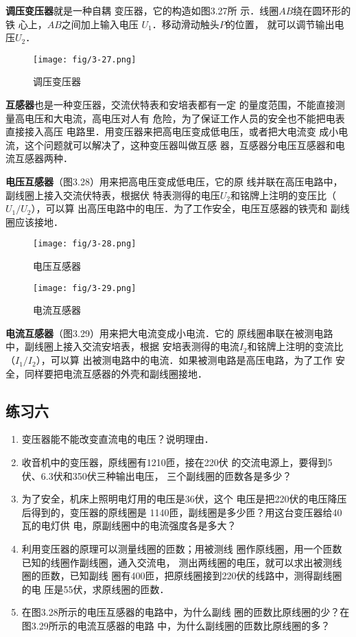 \textbf{调压变压器}就是一种自耦
变压器，它的构造如图3.27所
示．线圈$AB$绕在圆环形的铁
心上，$AB$之间加上输入电压
$U_1$．移动滑动触头$P$的位置，
就可以调节输出电压$U_2$．
\begin{figure}[htp]\centering
\texttt{[image: fig/3-27.png]}
\caption{调压变压器}
\end{figure}

\textbf{互感器}也是一种变压器，交流伏特表和安培表都有一定
的量度范围，不能直接测量高电压和大电流，高电压对人有
危险，为了保证工作人员的安全也不能把电表直接接入高压
电路里．用变压器来把高电压变成低电压，或者把大电流变
成小电流，这个问题就可以解决了，这种变压器叫做互感
器，互感器分电压互感器和电流互感器两种．

\textbf{电压互感器}（图3.28）用来把高电压变成低电压，它的原
线并联在高压电路中，副线圈上接入交流伏特表，根据伏
特表测得的电压$U_2$和铭牌上注明的变压比（$U_1/U_2$），可以算
出高压电路中的电压．为了工作安全，电压互感器的铁壳和
副线圈应该接地．


\begin{figure}[htp]\centering
	\begin{minipage}[t]{0.48\textwidth}
		\centering
\texttt{[image: fig/3-28.png]}
\caption{电压互感器}
	\end{minipage}
	\begin{minipage}[t]{0.48\textwidth}
		\centering
\texttt{[image: fig/3-29.png]}
\caption{电流互感器}
	\end{minipage}
\end{figure}

\textbf{电流互感器}（图3.29）用来把大电流变成小电流．它的
原线圈串联在被测电路中，副线圈上接入交流安培表，根据
安培表测得的电流$I_2$和铭牌上注明的变流比（$I_1/I_2$），可以算
出被测电路中的电流．如果被测电路是高压电路，为了工作
安全，同样要把电流互感器的外壳和副线圈接地．

\subsection*{练习六}
\begin{enumerate}
    \item 变压器能不能改变直流电的电压？说明理由．
    \item 收音机中的变压器，原线圈有1210匝，接在220伏
的交流电源上，要得到5伏、6.3伏和350伏三种输出电压，
三个副线圈的匝数各是多少？
\item 为了安全，机床上照明电灯用的电压是36伏，这个
电压是把220伏的电压降压后得到的，变压器的原线圈是
1140匝，副线圈是多少匝？用这台变压器给40瓦的电灯供
电，原副线圈中的电流强度各是多大？
\item 利用变压器的原理可以测量线圈的匝数；用被测线
圈作原线圈，用一个匝数已知的线圈作副线圈，通入交流电，
测出两线圈的电压，就可以求出被测线圈的匝数，已知副线
圈有400匝，把原线圈接到220伏的线路中，测得副线圈的电
压是55伏，求原线圈的匝数．
\item 在图3.28所示的电压互感器的电路中，为什么副线
圈的匝数比原线圈的少？在图3.29所示的电流互感器的电路
中，为什么副线圈的匝数比原线圈的多？
\end{enumerate}

